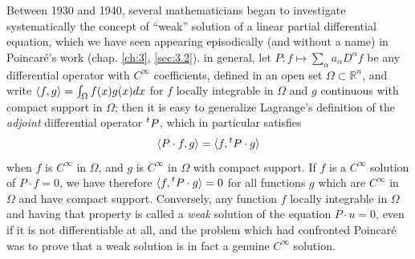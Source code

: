 \documentclass[12pt,a4paper,leqno,twoside]{extbook}
\DeclarePairedDelimiter{\ip}{\langle}{\rangle}
\newcommand{\R}{\mathbb{R}}
\begin{document}
Between 1930 and 1940, several mathematicians began to investigate systematically the concept of ``weak'' solution of a linear partial differential equation, which we have seen appearing episodically (and without a name) in Poincaré's work (chap. \ref{ch:3}, \ref{sec:3.2}). in general, let \(P: f \mapsto \sum\limits_\alpha a_\alpha D^\alpha f\) be any differential operator with \(C^\infty\) coefficients, defined in an open set \(\Omega \subset \R^n\), and write \(\ip{f,g} = \int_\Omega f(x)g(x)dx\) for \(f\) locally integrable in \(\Omega\) and \(g\) continuous with compact support in \(\Omega\); then it is easy to generalize Lagrange's definition of the \emph{adjoint} differential operator \(\prescript{t}{}P\), which in particular satisfies
\begin{equation}
    \label{eq:8.1}
    \ip{P \cdot f, g} = \ip{f, \prescript{t}{}P \cdot g}
\end{equation}
when \(f\) is \(C^\infty\) in \(\Omega\), and \(g\) is \(C^\infty\) in \(\Omega\) with compact support. If \(f\) is a \(C^\infty\) solution of \(P \cdot f = 0\), we have therefore \(\ip{f,\prescript{t}{}P \cdot g} = 0\) for all functions \(g\) which are \(C^\infty\) in \(\Omega\) and have compact support. Conversely, any function \(f\) locally integrable in \(\Omega\) and having that property is called a \emph{weak} solution of the equation \(P \cdot u = 0\), even if it is not differentiable at all, and the problem which had confronted Poincaré was to prove that a weak solution is in fact a genuine \(C^\infty\) solution.
\end{document}
